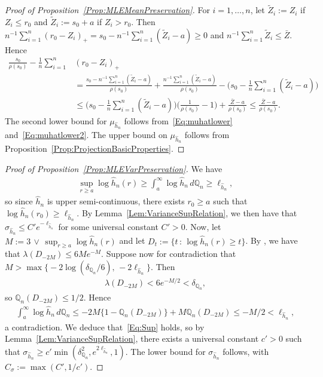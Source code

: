 \documentclass[a4paper,12pt]{article}
\begin{document}
\begin{proof}[Proof of Proposition~\ref{Prop:MLEMeanPreservation}]
For $i=1,\ldots,n$, let $\tilde{Z}_i := Z_i$ if $Z_i \leq r_0$ and $\tilde{Z}_i := s_0 + a$ if $Z_i > r_0$.  Then $n^{-1} \sum_{i=1}^n (r_0 - Z_i)_+ = s_0 - n^{-1} \sum_{i=1}^n (\tilde{Z}_i - a) \geq 0$ and $n^{-1} \sum_{i=1}^n \tilde{Z}_i \leq \bar{Z}$.  Hence
\begin{align}
\label{Eq:muhatlower2}
  \frac{s_0}{\rho(s_0)} - \frac{1}{n} \sum_{i=1}^n &(r_0 - Z_i)_+ \nonumber \\
&=  \frac{s_0 - n^{-1} \sum_{i=1}^n (\tilde{Z}_i - a)}{\rho(s_0)}
    + \frac{n^{-1} \sum_{i=1}^n (\tilde{Z}_i - a)}{\rho(s_0)} - \biggl(s_0 - \frac{1}{n} \sum_{i=1}^n (\tilde{Z}_i - a)\biggr) \nonumber \\
  &\leq  \biggl(s_0 - \frac{1}{n} \sum_{i=1}^n (\tilde{Z}_i - a)\biggr) \biggl( \frac{1}{\rho(s_0)} - 1 \biggr)
    + \frac{\bar{Z} - a}{\rho(s_0)} \leq \frac{\bar{Z} - a}{\rho(s_0)}.
\end{align}
The second lower bound for $\mu_{\hat{h}_n}$ follows from~\eqref{Eq:muhatlower} and~\eqref{Eq:muhatlower2}.  The upper bound on $\mu_{\hat{h}_n}$ follows from Proposition~\ref{Prop:ProjectionBasicProperties}.
\end{proof}

\begin{proof}[Proof of Proposition~\ref{Prop:MLEVarPreservation}]
We have
  \begin{align*}
 \sup_{r \geq a} \log \hat{h}_n(r) \geq \int_{a}^\infty \log \hat{h}_n \, d\mathbb{Q}_n \geq \ell_{\hat{h}_n},
  \end{align*}
so since $\hat{h}_n$ is upper semi-continuous, there exists $r_0 \geq a$ such that $\log \hat{h}_n(r_0) \geq \ell_{\hat{h}_n}$. By Lemma~\ref{Lem:VarianceSupRelation}, we then have that $\sigma_{\hat{h}_n} \leq C' e^{- \ell_{\hat{h}_n}}$ for some universal constant $C' > 0$.  Now, let $M := 3 \, \vee \, \sup_{r \geq a} \log \hat{h}_n(r)$ and let $D_t := \{t \,:\, \log \hat{h}_n(r) \geq t \}$.  By \cite[][Lemma~4.1]{dumbgen2011approximation}, we have that $\lambda( D_{-2M} ) \leq 6 M e^{-M}$.  Suppose now for contradiction that $M > \max \bigl\{ - 2 \log(\delta_{\mathbb{Q}_n}/6),\,  - 2 \ell_{\hat{h}_n} \bigr\}$.  Then
    \begin{align*}
      \lambda( D_{-2M} ) < 6 e^{- M/2} < \delta_{\mathbb{Q}_n},
    \end{align*}
so $\mathbb{Q}_n( D_{-2M}) \leq 1/2$.  Hence
 \begin{align*}
    \int_{a}^\infty \log \hat{h}_n \, d \mathbb{Q}_n \leq - 2M \{ 1 - \mathbb{Q}_n(D_{-2M}) \} + M \mathbb{Q}_n(D_{-2M})                                \leq - M/2 < \ell_{\hat{h}_n},
  \end{align*}
a contradiction.  We deduce that~\eqref{Eq:Sup} holds, so by Lemma~\ref{Lem:VarianceSupRelation}, there exists a universal constant $c' > 0 $ such that $\sigma_{\hat{h}_n} \geq c' \min( \delta_{\mathbb{Q}_n}^2, e^{2\ell_{\hat{h}_n}},1 )$.  The lower bound for $\sigma_{\hat{h}_n}$ follows, with $C_\sigma := \max(C', 1/c')$.
  \end{proof}
\end{document}
